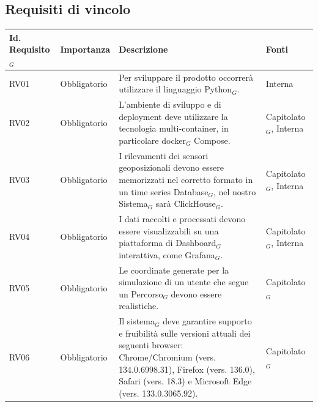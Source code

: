 \documentclass[10pt]{article}
\begin{document}
\begin{justify}
\newpage
\subsection{Requisiti di vincolo}

\begin{table}[H]
\centering
\renewcommand{\arraystretch}{1.5}
\begin{tabular}{|>{\centering\arraybackslash}m{2.7cm}|>{\centering\arraybackslash}m{2.7cm}|>{\centering\arraybackslash}m{6cm}|>{\centering\arraybackslash}m{2.1cm}|}
\hline
\textbf{Id. Requisito$_G$} & \textbf{Importanza} & \textbf{Descrizione} & \textbf{Fonti}\\
\hline
RV01 & Obbligatorio &  Per sviluppare il prodotto occorrerà utilizzare il linguaggio Python$_G$. & Interna\\
\hline 
RV02 & Obbligatorio & L'ambiente di sviluppo e di deployment deve utilizzare la tecnologia multi-container, in particolare docker$_G$ Compose. & Capitolato$_G$, Interna\\
\hline
RV03 & Obbligatorio & I rilevamenti dei sensori geoposizionali
devono essere memorizzati nel corretto formato in un time series Database$_G$, nel nostro Sistema$_G$ sarà ClickHouse$_G$. & Capitolato$_G$, Interna \\
\hline
RV04 & Obbligatorio & I dati raccolti e processati devono essere visualizzabili su una piattaforma di Dashboard$_G$ interattiva, come Grafana$_G$. & Capitolato$_G$, Interna\\
\hline
RV05 & Obbligatorio & Le coordinate generate per la simulazione di un utente che segue un Percorso$_G$ devono essere realistiche. & Capitolato$_G$\\
\hline
RV06 & Obbligatorio & Il sistema$_G$ deve garantire supporto e fruibilità sulle versioni attuali dei seguenti browser: Chrome/Chromium (vers. 134.0.6998.31), Firefox (vers. 136.0), Safari (vers. 18.3) e Microsoft Edge (vers. 133.0.3065.92). & Capitolato$_G$\\

\end{tabular}
\end{table}
\end{justify}
\end{document}
